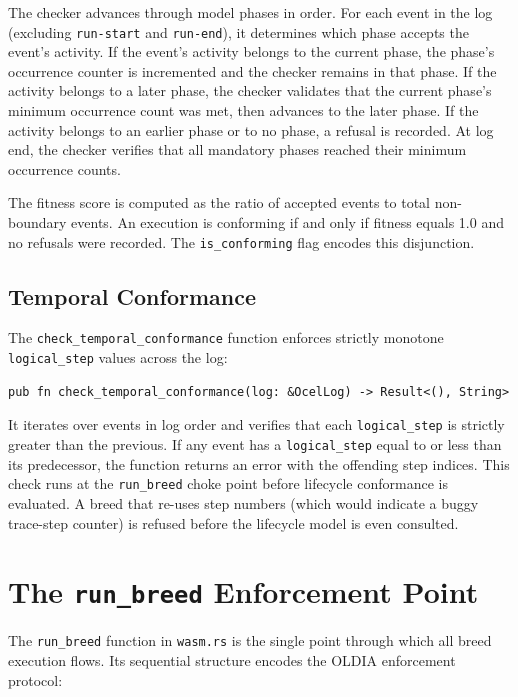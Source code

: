 The checker advances through model phases in order. For each event in the log (excluding \texttt{run-start} and \texttt{run-end}), it determines which phase accepts the event's activity. If the event's activity belongs to the current phase, the phase's occurrence counter is incremented and the checker remains in that phase. If the activity belongs to a later phase, the checker validates that the current phase's minimum occurrence count was met, then advances to the later phase. If the activity belongs to an earlier phase or to no phase, a refusal is recorded. At log end, the checker verifies that all mandatory phases reached their minimum occurrence counts.

The fitness score is computed as the ratio of accepted events to total non-boundary events. An execution is conforming if and only if fitness equals 1.0 and no refusals were recorded. The \texttt{is\_conforming} flag encodes this disjunction.

\subsection{Temporal Conformance}

The \texttt{check\_temporal\_conformance} function enforces strictly monotone \texttt{logical\_step} values across the log:

\begin{verbatim}
pub fn check_temporal_conformance(log: &OcelLog) -> Result<(), String>
\end{verbatim}

It iterates over events in log order and verifies that each \texttt{logical\_step} is strictly greater than the previous. If any event has a \texttt{logical\_step} equal to or less than its predecessor, the function returns an error with the offending step indices. This check runs at the \texttt{run\_breed} choke point before lifecycle conformance is evaluated. A breed that re-uses step numbers (which would indicate a buggy trace-step counter) is refused before the lifecycle model is even consulted.

\section{The \texttt{run\_breed} Enforcement Point}
\label{sec:run-breed}

The \texttt{run\_breed} function in \texttt{wasm.rs} is the single point through which all breed execution flows. Its sequential structure encodes the OLDIA enforcement protocol:

